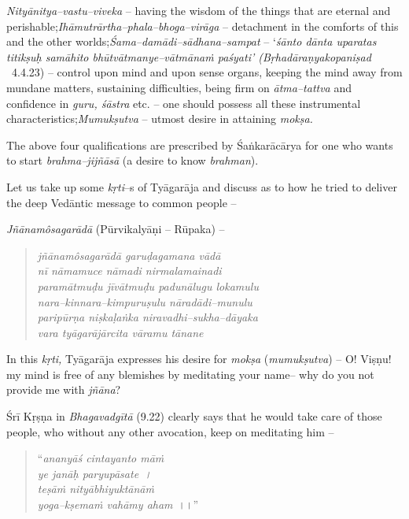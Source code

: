 \begin{enumerate}
\textit{Nityānitya–vastu–viveka} – having the wisdom of the things that are eternal and perishable;\textit{Ihāmutrārtha–phala–bhoga–virāga} – detachment in the comforts of this and the other worlds;\textit{Śama–damādi–sādhana–sampat} – ‘\textit{śānto dānta uparatas titikṣuḥ samāhito bhūtvātmanye–vātmānaṁ paśyati’ (Bṛhadāraṇyakopaniṣad}  4.4.23) – control upon mind and upon sense organs, keeping the mind away from mundane matters, sustaining difficulties, being firm on \textit{ātma–tattva} and confidence in \textit{guru, śāstra} etc. – one should possess all these instrumental characteristics;\textit{Mumukṣutva} – utmost desire in attaining \textit{mokṣa.}
\end{enumerate}

The above four qualifications are prescribed by Śaṅkarācārya for one who wants to start \textit{brahma–jijñāsā} (a desire to know \textit{brahman}).

Let us take up some \textit{kṛti}–s of Tyāgarāja and discuss as to how he tried to deliver the deep Vedāntic message to common people –

\textit{Jñānamôsagarādā} (Pūrvikalyāṇi – Rūpaka) –

\begin{verse}
\textit{jñānamôsagarādā garuḍagamana vādā} \\\textit{nī nāmamuce nāmadi nirmalamainadi} \\\textit{paramātmuḍu jīvātmuḍu padunālugu lokamulu}\\\textit{nara–kinnara–kimpuruṣulu nāradādi–munulu}\\\textit{paripūrṇa niṣkaḷaṅka niravadhi–sukha–dāyaka}\\\textit{vara tyāgarājārcita vāramu tānane}
\end{verse}

In this \textit{kṛti,} Tyāgarāja expresses his desire for \textit{mokṣa} (\textit{mumukṣutva}) – O! Viṣṇu! my mind is free of any blemishes by meditating your name– why do you not provide me with \textit{jñāna}?

Śrī Kṛṣṇa in \textit{Bhagavadgītā} (9.22) clearly says that he would take care of those people, who without any other avocation, keep on meditating him –

\begin{verse}
“\textit{ananyāś cintayanto māṁ}\\\textit{ye janāḥ paryupāsate~।}\\\textit{teṣāṁ nityābhiyuktānāṁ}\\\textit{yoga–kṣemaṁ vahāmy aham}~।।”
\end{verse}

